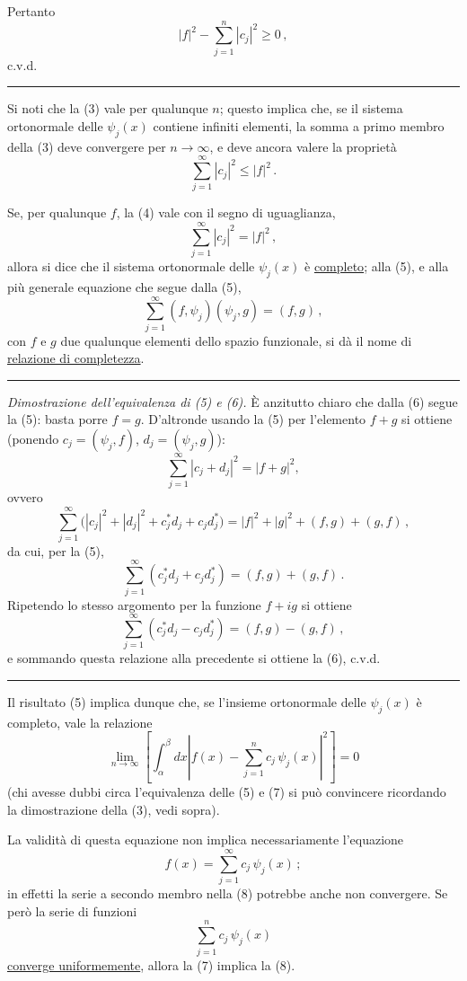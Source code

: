 \documentclass[11pt, a4paper]{book}
\numberwithin{equation}{section}
\begin{document}
Pertanto
\[
|f|^2-\sum_{j=1}^{n}|c_j|^2\geq 0\,,
\]
c.v.d.
\medskip\hrule\medskip

Si noti che la (3) vale per qualunque $n$; questo implica che, se il sistema ortonormale delle $\psi_j(x)$ contiene infiniti elementi, la somma a primo membro della (3) deve convergere per $n\to\infty$, e deve ancora valere la proprietà
\begin{equation}
\sum_{j=1}^{\infty}|c_j|^2\leq |f|^2\,.
\end{equation}

Se, per qualunque $f$, la (4) vale con il segno di uguaglianza,
\begin{equation}
\sum_{j=1}^{\infty}|c_j|^2=|f|^2\,,
\end{equation}
allora si dice che il sistema ortonormale delle $\psi_j(x)$ è \uline{completo}; alla (5), e alla più generale equazione che segue dalla (5),
\begin{equation}
\sum_{j=1}^{\infty}(f,\psi_j)(\psi_j,g)=(f,g)\,,
\end{equation}
con $f$ e $g$ due qualunque elementi dello spazio funzionale, si dà il nome di \uline{relazione di completezza}.

\hrule
\medskip
\noindent\textit{Dimostrazione dell'equivalenza di (5) e (6).} È anzitutto chiaro che dalla (6) segue la (5): basta porre $f=g$. D'altronde usando la (5) per l'elemento $f+g$ si ottiene (ponendo $c_j=(\psi_j,f)$, $d_j=(\psi_j,g)$):
\[
\sum_{j=1}^{\infty}|c_j+d_j|^2=|f+g|^2,
\]
ovvero
\[
\sum_{j=1}^{\infty}\bigl(|c_j|^2+|d_j|^2+c_j^*d_j+c_j d_j^*\bigr)
=|f|^2+|g|^2+(f,g)+(g,f)\,,
\]
da cui, per la (5),
\[
\sum_{j=1}^{\infty}(c_j^*d_j+c_jd_j^*)=(f,g)+(g,f)\,.
\]
Ripetendo lo stesso argomento per la funzione $f+ig$ si ottiene
\[
\sum_{j=1}^{\infty}(c_j^*d_j-c_jd_j^*)=(f,g)-(g,f)\,,
\]
e sommando questa relazione alla precedente si ottiene la (6), c.v.d.
\medskip\hrule\medskip

Il risultato (5) implica dunque che, se l'insieme ortonormale delle $\psi_j(x)$ è completo, vale la relazione
\begin{equation}
\lim_{n\to\infty}\left[\int_\alpha^\beta dx\left|f(x)-\sum_{j=1}^{n}c_j\,\psi_j(x)\right|^2\right]=0
\end{equation}
(chi avesse dubbi circa l'equivalenza delle (5) e (7) si può convincere ricordando la dimostrazione della (3), vedi sopra).

La validità di questa equazione non implica necessariamente l'equazione
\begin{equation}
f(x)=\sum_{j=1}^{\infty}c_j\,\psi_j(x)\,;
\end{equation}
in effetti la serie a secondo membro nella (8) potrebbe anche non convergere. Se però la serie di funzioni
\[
\sum_{j=1}^{n}c_j\,\psi_j(x)
\]
\uline{converge uniformemente}, allora la (7) implica la (8).
\end{document}
